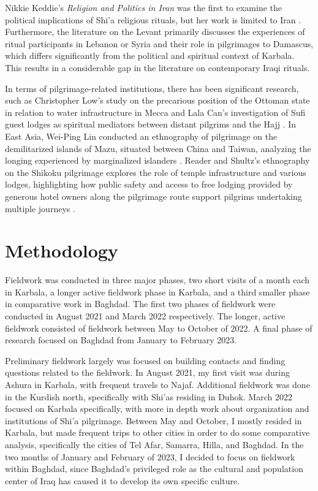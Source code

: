 Nikkie Keddie's \emph{Religion and Politics in Iran} was the first to examine the political implications of Shi'a religious rituals, but her work is limited to Iran \cite{keddie_religion_1983}. Furthermore, the literature on the Levant primarily discusses the experiences of ritual participants in Lebanon or Syria and their role in pilgrimages to Damascus, which differs significantly from the political and spiritual context of Karbala. This results in a considerable gap in the literature on contemporary Iraqi rituals.

In terms of pilgrimage-related institutions, there has been significant research, such as Christopher Low's study on the precarious position of the Ottoman state in relation to water infrastructure in Mecca \cite{low_imperial_2020} and Lala Can's investigation of Sufi guest lodges as spiritual mediators between distant pilgrims and the Hajj \cite{can_spiritual_2020}. In East Asia, Wei-Ping Lin conducted an ethnography of pilgrimage on the demilitarized islands of Mazu, situated between China and Taiwan, analyzing the longing experienced by marginalized islanders \cite{lin_virtual_2014}. Reader and Shultz's ethnography on the Shikoku pilgrimage explores the role of temple infrastructure and various lodges, highlighting how public safety and access to free lodging provided by generous hotel owners along the pilgrimage route support pilgrims undertaking multiple journeys \cite{reader_pilgrims_2021}.

\section{Methodology}

Fieldwork was conducted in three major phases, two short visits of a month each in Karbala, a longer active fieldwork phase in Karbala, and a third smaller phase in comparative work in Baghdad. The first two phases of fieldwork were conducted in August 2021 and March 2022 respectively. The longer, active fieldwork consisted of fieldwork between May to October of 2022. A final phase of research focused on Baghdad from January to February 2023. 

Preliminary fieldwork largely was focused on building contacts and finding questions related to the fieldwork. In August 2021, my first visit was during Ashura in Karbala, with frequent travels to Najaf. Additional fieldwork was done in the Kurdish north, specifically with Shi'as residing in Duhok. March 2022 focused on Karbala specifically, with more in depth work about organization and institutions of Shi'a pilgrimage. Between May and October, I mostly resided in Karbala, but made frequent trips to other cities in order to do some comparative analysis, specifically the cities of Tel Afar, Samarra, Hilla, and Baghdad. In the two months of January and February of 2023, I decided to focus on fieldwork within Baghdad, since Baghdad's privileged role as the cultural and population center of Iraq has caused it to develop its own specific culture. 

